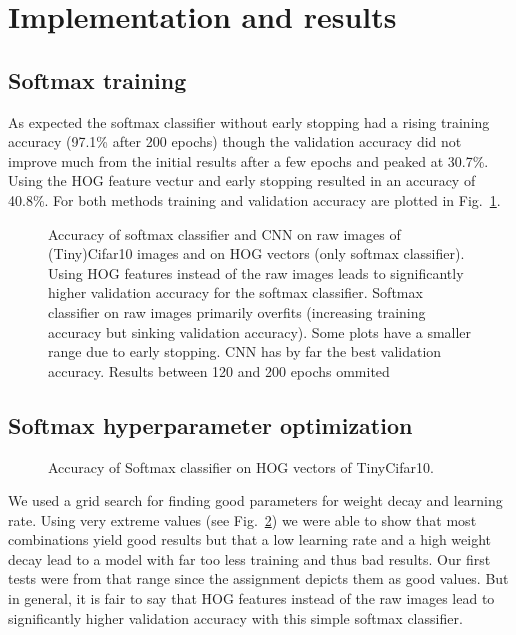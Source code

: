 \section{Implementation and results}

\subsection{Softmax training}
As expected the softmax classifier without early stopping had a rising training accuracy (97.1\% after 200 epochs) though the validation accuracy did not improve much from the initial results after a few epochs and peaked at 30.7\%. Using the HOG feature vectur and early stopping resulted in an accuracy of 40.8\%. For both methods training and validation accuracy are plotted in Fig.~\ref{fig:accuracy}.
\begin{figure}[h!t]
\newcommand{\plotref}[1]{{[~\ref{plt:#1}~]}}
\centering
\caption{Accuracy of softmax classifier and CNN on raw images of (Tiny)Cifar10 images and on HOG vectors (only softmax classifier). Using HOG features instead of the raw images leads to significantly higher validation accuracy for the softmax classifier. Softmax classifier on raw images primarily overfits (increasing training accuracy but sinking validation accuracy). Some plots have a smaller range due to early stopping. CNN has by far the best validation accuracy. Results between 120 and 200 epochs ommited} %
\label{fig:accuracy}
\end{figure}


\subsection{Softmax hyperparameter optimization}


\begin{figure}[h!t]
\newcommand{\plotref}[1]{{[~\ref{plt:#1}~]}}
\centering
\caption{Accuracy of Softmax classifier on HOG vectors of TinyCifar10. } %
\label{figparam-opt-hog6}
\end{figure}

We used a grid search for finding good parameters for weight decay and learning rate. Using very extreme values (see Fig.~\ref{figparam-opt-hog6}) we were able to show that most combinations yield good results but that a low learning rate and a high weight decay lead to a model with far too less training and thus bad results. Our first tests were from that range since the assignment depicts them as good values. But in general, it is fair to say that HOG features instead of the raw images lead to significantly higher validation accuracy with this simple softmax classifier.

